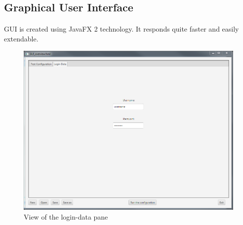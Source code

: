 \subsection{Graphical User Interface}

\paragraph{}GUI is created using JavaFX 2 technology. It responds quite faster and easily  extendable.

\begin{figure}[h!]
\centering
\includegraphics[width=\textwidth]{gui_login.png}
\caption{View of the login-data pane}
\end{figure}
